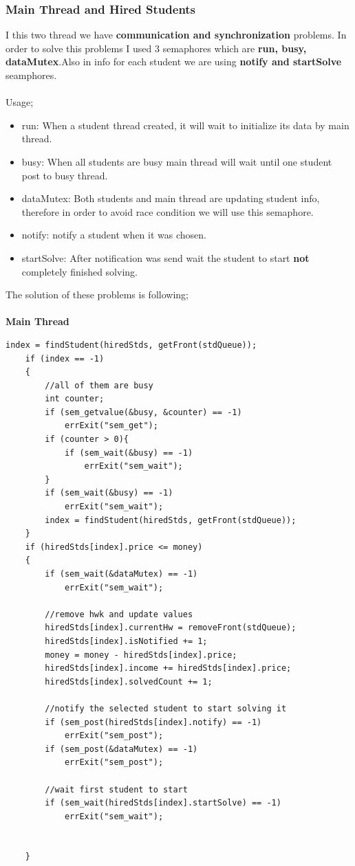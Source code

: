 \documentclass{article}
\begin{document}
\subsubsection*{Main Thread and Hired Students}
I this two thread we have \textbf{communication and synchronization} problems. In order to solve this problems I used 3 semaphores 
which are \textbf{run, busy, dataMutex}.Also in info for each student we are using \textbf{notify and startSolve} seamphores. \\ \\
Usage;
\begin{itemize}
	\item run: When a student thread created, it will wait to initialize its data by main thread.
	\item busy: When all students are busy main thread will wait until one student post to busy thread.
	\item dataMutex: Both students and main thread are updating student info, therefore in order to avoid race
	condition we will use this semaphore.
	\item notify: notify a student when it was chosen.
	\item startSolve: After notification was send wait the student to start \textbf{not} completely finished solving.
\end{itemize}
The solution of these problems is following;\\ \\
\textbf{Main Thread}
\begin{lstlisting}[style=CStyle]
	index = findStudent(hiredStds, getFront(stdQueue));
	if (index == -1)
	{
		//all of them are busy
		int counter;
		if (sem_getvalue(&busy, &counter) == -1)
			errExit("sem_get");
		if (counter > 0){
			if (sem_wait(&busy) == -1)
				errExit("sem_wait");
		}
		if (sem_wait(&busy) == -1)
			errExit("sem_wait");
		index = findStudent(hiredStds, getFront(stdQueue));
	}
	if (hiredStds[index].price <= money)
	{
		if (sem_wait(&dataMutex) == -1)
			errExit("sem_wait");
			
		//remove hwk and update values  
		hiredStds[index].currentHw = removeFront(stdQueue);
		hiredStds[index].isNotified += 1;
		money = money - hiredStds[index].price;
		hiredStds[index].income += hiredStds[index].price;
		hiredStds[index].solvedCount += 1;
		
		//notify the selected student to start solving it
		if (sem_post(hiredStds[index].notify) == -1)
			errExit("sem_post");
		if (sem_post(&dataMutex) == -1)
			errExit("sem_post");
			
		//wait first student to start
		if (sem_wait(hiredStds[index].startSolve) == -1)
			errExit("sem_wait");


	}
\end{lstlisting}
\end{document}
